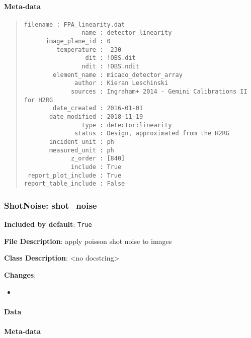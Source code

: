 \paragraph{Meta-data%
  \label{id10}%
}

\begin{quote}
\begin{alltt}
\begin{lstlisting}[frame=single]
            filename : FPA_linearity.dat
                name : detector_linearity
      image_plane_id : 0
         temperature : -230
                 dit : !OBS.dit
                ndit : !OBS.ndit
        element_name : micado_detector_array
              author : Kieran Leschinski
             sources : Ingraham+ 2014 - Gemini Calibrations II for H2RG
        date_created : 2016-01-01
       date_modified : 2018-11-19
                type : detector:linearity
              status : Design, approximated from the H2RG
       incident_unit : ph
       measured_unit : ph
             z_order : [840]
             include : True
 report_plot_include : True
report_table_include : False
\end{lstlisting}
\end{alltt}
\end{quote}


\subsubsection{ShotNoise: \textquotedbl{}shot\_noise\textquotedbl{}%
  \label{shotnoise-shot-noise}%
}

\textbf{Included by default}: \texttt{True}

\textbf{File Description}: apply poisson shot noise to images

\textbf{Class Description}: <no docstring>

\textbf{Changes}:

\begin{itemize}
\item \end{itemize}


\paragraph{Data%
  \label{id11}%
}


\paragraph{Meta-data%
  \label{id12}%
}

